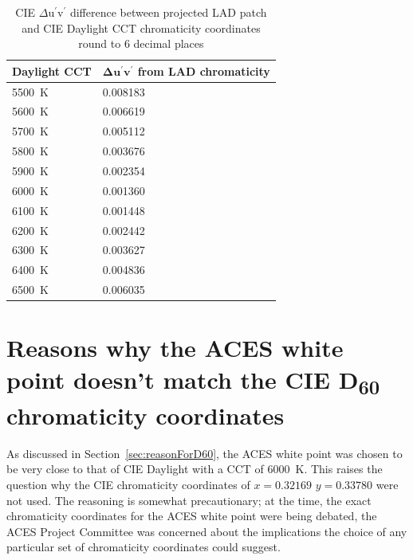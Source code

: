 \begin{table}[!ht]
    \centering
    \begin{tabularx}{.75\linewidth}{|Y|Y|}
    \hline
    \textbf{Daylight CCT} & $\boldsymbol{\Delta u^\prime v^\prime}$ \textbf{from LAD chromaticity}\\ \hline
		\SI[mode=text]{5500}{\kelvin} & 0.008183 \\ \hline
		\SI[mode=text]{5600}{\kelvin} & 0.006619 \\ \hline
		\SI[mode=text]{5700}{\kelvin} & 0.005112 \\ \hline
		\SI[mode=text]{5800}{\kelvin} & 0.003676 \\ \hline
		\SI[mode=text]{5900}{\kelvin} & 0.002354 \\ \hline
		\SI[mode=text]{6000}{\kelvin} & 0.001360 \\ \hline
		\SI[mode=text]{6100}{\kelvin} & 0.001448 \\ \hline
		\SI[mode=text]{6200}{\kelvin} & 0.002442 \\ \hline
		\SI[mode=text]{6300}{\kelvin} & 0.003627 \\ \hline
		\SI[mode=text]{6400}{\kelvin} & 0.004836 \\ \hline
		\SI[mode=text]{6500}{\kelvin} & 0.006035 \\ \hline
    \end{tabularx}
    \captionsetup{width=.75\textwidth}
    \caption{CIE $\Delta$u$^\prime$v$^\prime$ difference between projected LAD patch and CIE Daylight CCT chromaticity coordinates round to 6 decimal places \cite{tableValsPython}}
    \label{tab:lad}
\end{table}


\section{Reasons why the ACES white point doesn't match the CIE \texorpdfstring{D\textsubscript{60}}{D60} chromaticity coordinates}
\label{sec:reasonsForDifference}
As discussed in Section~\ref{sec:reasonForD60}, the ACES white point was chosen to be very close to that of CIE Daylight with a CCT of \SI[mode=text]{6000}{\kelvin}.  This raises the question why the CIE chromaticity coordinates of $x=0.32169$ $y=0.33780$ were not used.  The reasoning is somewhat precautionary; at the time, the exact chromaticity coordinates for the ACES white point were being debated, the ACES Project Committee was concerned about the implications the choice of any particular set of chromaticity coordinates could suggest.  

